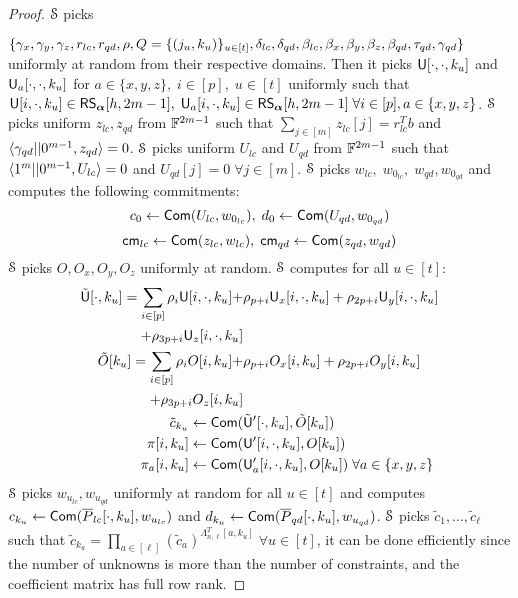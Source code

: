 \begin{proof}
	 $\mathcal{S}$ picks 
	
	$\{\gamma_x, \gamma_y, \gamma_z, r_{lc}, r_{qd}, \rho, Q=\{(j_u,k_u)\}_{u\in[t]}, \delta_{lc}, \delta_{qd}, \beta_{lc},\\ \beta_x, \beta_y, \beta_z, \beta_{qd}, \tau_{qd}, \gamma_{qd}\}$ uniformly at random from their respective domains. Then it picks $\mathsf{U}[\cdot,\cdot, k_u]$ and $\mathsf{U}_a[\cdot,\cdot,k_u]$ for $a\in\{x,y,z\}, \; i\in[p],\; u\in[t]$ uniformly such that $\mathsf{U}[i,\cdot, k_u] \in \mathsf{RS}_{\bm{\alpha}}[h,2m-1], \; \mathsf{U}_a[i,\cdot,k_u]\in \mathsf{RS}_{\bm{\alpha}}[h,2m-1]\; \forall i\in[p], a\in\{x,y,z\}$.
	$\mathcal{S}$ picks uniform $z_{lc}, z_{qd}$ from $\mathbb{F}^{2m-1}$ such that $\sum_{j\in[m]} z_{lc}[j] = r_{lc}^Tb$ and $\langle \gamma_{qd}||0^{m-1},z_{qd}\rangle = 0$.
	$\mathcal{S}$ picks uniform $U_{lc}$ and $U_{qd}$ from $\mathbb{F}^{2m-1}$ such that $\langle 1^m||0^{m-1},U_{lc}\rangle = 0$ and $U_{qd}[j]=0 \; \forall j\in[m]$. 
	$\mathcal{S}$ picks $w_{lc},\;w_{0_{lc}}, \;w_{qd},w_{0_{qd}}$ and computes the following commitments: 
	\[c_0\leftarrow \mathsf{Com}(U_{lc},w_{0_{lc}}), \; d_0\leftarrow \mathsf{Com}(U_{qd},w_{0_{qd}})\]
	\[\mathsf{cm}_{lc} \leftarrow \mathsf{Com}(z_{lc},w_{lc}), \; \mathsf{cm}_{qd} \leftarrow \mathsf{Com}(z_{qd},w_{qd})\]
	$\mathcal{S}$ picks $O, O_x, O_y, O_z$ uniformly at random. $\mathcal{S}$ computes for all $u\in[t]$:
	\begin{align*}
	\tilde{\mathsf{U}}[\cdot,k_u]= \sum_{i\in[p]} \rho_i\mathsf{U}[i,\cdot, k_u]+ &\rho_{p+i} \mathsf{U}_x[i,\cdot,k_u] + \rho_{2p+i} \mathsf{U}_y[i,\cdot,k_u]\\ + \rho_{3p+i} \mathsf{U}_z[i,\cdot,k_u]\\
	\tilde{O}[k_u]= \sum_{i\in[p]} \rho_i O[i, k_u]+ &\rho_{p+i} O_x[i,k_u] + \rho_{2p+i} O_y[i,k_u]\\ + \rho_{3p+i} O_z[i,k_u]\\
	\tilde{c}_{k_u} \leftarrow \mathsf{Com}(&\tilde{\mathsf{U}}'[\cdot,k_u], \tilde{O}[k_u])\\
	\pi[i,k_u]\leftarrow \mathsf{Com}(&\mathsf{U}'[i,\cdot,k_u], O[k_u])\\
	\pi_a[i,k_u]\leftarrow \mathsf{Com}(&\mathsf{U}_a'[i,\cdot,k_u], O[k_u])\; \forall a\in\{x,y,z\}
	\end{align*}
	$\mathcal{S}$ picks $w_{u_{lc}}, w_{u_{qd}}$ uniformly at random for all $u\in[t]$ and computes $c_{k_u}\leftarrow \mathsf{Com}(\overline{P}_{lc}[\cdot, k_u], w_{u_{lc}})$ and $d_{k_u}\leftarrow \mathsf{Com}(\overline{P}_{qd}[\cdot, k_u], w_{u_{qd}})$.
	$\mathcal{S}$ picks $\tilde{c}_1,\ldots,\tilde{c}_{\ell}$ such that $\tilde{c}_{k_u} = \prod_{a\in [\ell]} (\tilde{c}_a)^{\Lambda_{n,\ell}^T[a,k_u]}\; \forall u\in[t]$, it can be done efficiently since the number of unknowns is more than the number of constraints, and the coefficient matrix has full row rank.

\end{proof}
